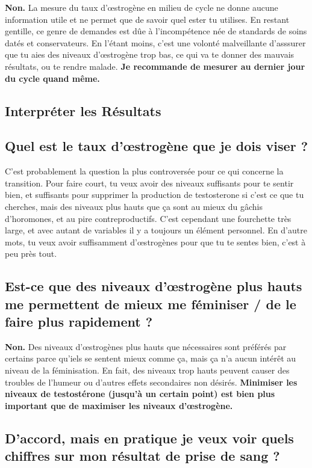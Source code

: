 \documentclass{article}
\begin{document}
\textbf{Non.} La mesure du taux d'œstrogène en milieu de cycle ne donne aucune information utile et ne permet que de savoir quel ester tu utilises. En restant gentille, ce genre de demandes est dûe à l'incompétence née de standards de soins datés et conservateurs. En l'étant moins, c'est une volonté malveillante d'asssurer que tu aies des niveaux d'œstrogène trop bas, ce qui va te donner des mauvais résultats, ou te rendre malade. \textbf{Je recommande de mesurer au dernier jour du cycle quand même.}

\subsection*{Interpréter les Résultats}

\subsection{Quel est le taux d'œstrogène que je dois viser ?}

C'est probablement la question la plus controversée pour ce qui concerne la transition. Pour faire court, tu veux avoir des niveaux suffisants pour te sentir bien, et suffisants pour supprimer la production de testosterone si c'est ce que tu cherches, mais des niveaux plus hauts que ça sont au mieux du gâchis d'horomones, et au pire contreproductifs. C'est cependant une fourchette très large, et avec autant de variables il y a toujours un élément personnel. En d'autre mots, tu veux avoir suffisamment d'œstrogènes pour que tu te sentes bien, c'est à peu près tout.

\subsection{Est-ce que des niveaux d'œstrogène plus hauts me permettent de mieux me féminiser / de le faire plus rapidement ?}

\textbf{Non.} Des niveaux d'œstrogènes plus hauts que nécessaires sont préférés par certains parce qu'iels se sentent mieux comme ça, mais ça n'a aucun intérêt au niveau de la féminisation. En fait, des niveaux trop hauts peuvent causer des troubles de l'humeur ou d'autres effets secondaires non désirés. \textbf{Minimiser les niveaux de testostérone (jusqu'à un certain point) est bien plus important que de maximiser les niveaux d'œstrogène.}

\subsection{D'accord, mais en pratique je veux voir quels chiffres sur mon résultat de prise de sang ?}
\end{document}
